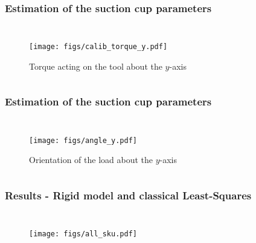 \documentclass[aspectratio=1610]{beamer}
\begin{document}
\begin{frame}
\frametitle{Estimation of the suction cup parameters}
\begin{columns}
  \column{37em}
  \begin{figure}
    \centering
    \texttt{[image: figs/calib\_torque\_y.pdf]}
    \vspace*{-0.3cm}
    \caption{Torque acting on the tool about the $y$-axis}
  \end{figure}
\end{columns}
\end{frame}

\begin{frame}
\frametitle{Estimation of the suction cup parameters}
\begin{columns}
  \column{37em}
  \begin{figure}
    \centering
    \texttt{[image: figs/angle\_y.pdf]}
    \vspace*{-0.7cm}
    \caption{Orientation of the load about the $y$-axis}
  \end{figure}
\end{columns}
\end{frame}

\begin{frame}
\frametitle{Results - Rigid model and classical Least-Squares}
\begin{columns}
  \column{37em}
  \begin{figure}
    \centering
    \texttt{[image: figs/all\_sku.pdf]}
  \end{figure}
\end{columns}
\end{frame}
\end{document}
